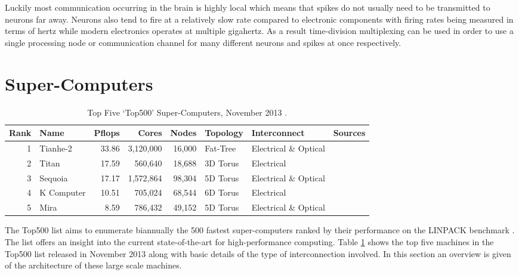 			Luckily most communication occurring in the brain is highly local which
			means that spikes do not usually need to be transmitted to neurons far
			away. Neurons also tend to fire at a relatively slow rate compared to
			electronic components with firing rates being measured in terms of hertz
			while modern electronics operates at multiple gigahertz. As a result
			time-division multiplexing can be used in order to use a single processing
			node or communication channel for many different neurons and spikes at
			once respectively.
	
	
	\section{Super-Computers}
		
		\label{sec:super-computers}
		
		\begin{table}
			\center
			\begin{tabular}{r l r r r l l l}
				\toprule
				Rank & Name    & Pflops& Cores  & Nodes  & Topology & Interconnect          & Sources \\
				\midrule                          
				1 & Tianhe-2   & 33.86 & 3,120,000 & 16,000 & Fat-Tree & Electrical \& Optical & \cite{dongarra13} \\
				2 & Titan      & 17.59 & 560,640   & 18,688 & 3D Torus & Electrical            & \cite{bland12} \\
				3 & Sequoia    & 17.17 & 1,572,864 & 98,304 & 5D Torus & Electrical \& Optical & \cite{prickett10} \\
				4 & K Computer & 10.51 & 705,024   & 68,544 & 6D Torus & Electrical            & \cite{fujitsu11,yokokawa11} \\
				5 & Mira       &  8.59 & 786,432   & 49,152 & 5D Torus & Electrical \& Optical & \cite{prickett10} \\
				\bottomrule
			\end{tabular}
			
			\caption{Top Five `Top500' Super-Computers, November 2013 \cite{meuer13n}.}
			\label{tab:top500}
		\end{table}
		
		The Top500 list \cite{meuer13n} aims to enumerate biannually the 500 fastest
		super-computers ranked by their performance on the LINPACK benchmark
		\cite{dongarraLINPAC}. The list offers an insight into the current
		state-of-the-art for high-performance computing. Table \ref{tab:top500}
		shows the top five machines in the Top500 list released in November 2013
		along with basic details of the type of interconnection involved. In this
		section an overview is given of the architecture of these large scale
		machines.
		
